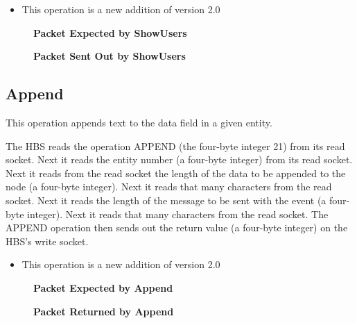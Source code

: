\begin{itemize}
\item{This operation is a new addition of version 2.0}
\end{itemize}

\begin{figure}[htb]
  \centerline{}
  \caption{{\bf Packet Expected by ShowUsers}}
  \label{fig:ShowUsers1}
\end{figure}

\begin{figure}[htb]
  \centerline{}
  \caption{{\bf Packet Sent Out by ShowUsers}}
  \label{fig:ShowUsers2}
\end{figure}

\newpage
\subsection{Append}

This operation appends text to the data field in a given entity.  

The HBS reads the operation APPEND (the four-byte integer 21) from its read
socket.  Next it reads the entity number (a four-byte integer) from its
read socket.  Next it reads from the read socket the length of the data to
be appended to the node (a four-byte integer).  Next it reads that many
characters from the read socket.  Next it reads the length of the
message to be sent with the event (a four-byte integer).  Next it reads
that many characters from the read socket.  The APPEND operation then
sends out the return value (a four-byte integer) on the HBS's write socket.

\begin{itemize}
\item{This operation is a new addition of version 2.0}
\end{itemize}

\begin{figure}[htb]
  \centerline{}
  \caption{{\bf Packet Expected by Append}}
  \label{fig:append1}
\end{figure}


\begin{figure}[htb]
  \centerline{}
  \caption{{\bf Packet Returned by Append}}
  \label{fig:Append2}
\end{figure}

\newpage
